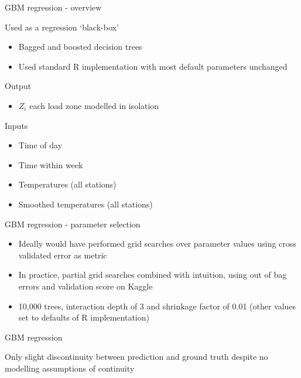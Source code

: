 \begin{frame}{GBM regression - overview}
  \begin{block}{Used as a regression `black-box'}
    \begin{itemize}
      \item Bagged and boosted decision trees
      \item Used standard R implementation with most default parameters unchanged
    \end{itemize}
  \end{block}
  \begin{block}{Output}
  	\begin{itemize}
      \item $Z_i$ \ie each load zone modelled in isolation
    \end{itemize}
  \end{block}
  \begin{block}{Inputs}
    \begin{itemize}
      \item Time of day
      \item Time within week
      \item Temperatures (all stations)
      \item Smoothed temperatures (all stations)
    \end{itemize}
  \end{block}
\end{frame}

\begin{frame}{GBM regression - parameter selection}
  \begin{itemize}
    \item Ideally would have performed grid searches over parameter values using cross validated error as metric
    \vspace{\baselineskip}
    \item In practice, partial grid searches combined with intuition, using out of bag errors and validation score on Kaggle
    \vspace{\baselineskip}
    \item 10,000 trees, interaction depth of 3 and shrinkage factor of 0.01 (other values set to defaults of R implementation)
  \end{itemize}
\end{frame}

\begin{frame}{GBM regression}
  \begin{centering}
    
    Only slight discontinuity between prediction and ground truth despite no modelling assumptions of continuity
  \end{centering}
\end{frame}

